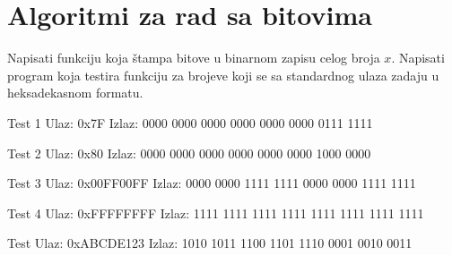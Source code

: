 \section{Algoritmi za rad sa bitovima}

\begin{Exercise}[label=201]
Napisati funkciju  koja štampa bitove u binarnom zapisu celog broja $x$. Napisati program koja testira funkciju  za brojeve koji se sa standardnog ulaza zadaju u heksadekasnom formatu.


\begin{maxitest}
\begin{test}{Test 1}
Ulaz:   0x7F  
Izlaz:  0000 0000 0000 0000 0000 0000 0111 1111    
\end{test}
\end{maxitest}

\begin{maxitest}
\begin{test}{Test 2}
Ulaz:   0x80
Izlaz:  0000 0000 0000 0000 0000 0000 1000 0000 
\end{test}
\end{maxitest}

\begin{maxitest}
\begin{test}{Test 3}
Ulaz:   0x00FF00FF
Izlaz:  0000 0000 1111 1111 0000 0000 1111 1111
\end{test}
\end{maxitest}

\begin{maxitest}
\begin{test}{Test 4}
Ulaz:   0xFFFFFFFF
Izlaz:  1111 1111 1111 1111 1111 1111 1111 1111 
\end{test}
\end{maxitest}

\begin{maxitest}
\begin{test}{Test }
Ulaz:   0xABCDE123
Izlaz:  1010 1011 1100 1101 1110 0001 0010 0011
\end{test}
\end{maxitest}

\end{Exercise}
\begin{Answer}[ref=201]
\end{Answer}

